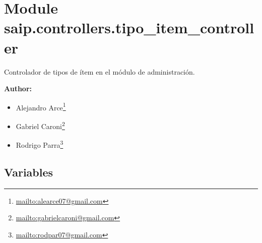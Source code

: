%
%
%


\section{Module saip.controllers.tipo\_item\_controller}

    \label{saip:controllers:tipo_item_controller}
Controlador de tipos de ítem en el módulo de administración.

\textbf{Author:} \begin{itemize}
\setlength{\parskip}{0.6ex}
  \item Alejandro 
    Arce\footnote{\href{mailto:alearce07@gmail.com}{mailto:alearce07@gmail.com}}

  \item Gabriel 
    Caroni\footnote{\href{mailto:gabrielcaroni@gmail.com}{mailto:gabrielcaroni@gmail.com}}

  \item Rodrigo 
    Parra\footnote{\href{mailto:rodpar07@gmail.com}{mailto:rodpar07@gmail.com}}

\end{itemize}





  \subsection{Variables}


